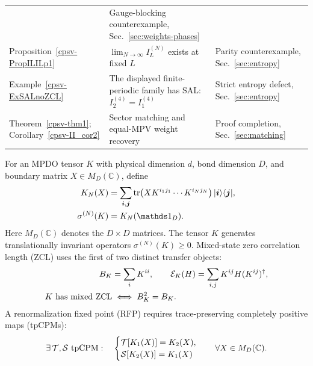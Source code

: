 \documentclass[aps,pra,reprint,nofootinbib,onecolumn]{revtex4-2}
\begin{document}
\begin{table}[t]
\begin{tabular}{@{}p{}p{}p{}@{}}
		                   & \raggedcell Gauge-blocking counterexample, Sec.~\ref{sec:weights-phases}                                                   \\[0.4em]
		\raggedcell Proposition~\ref{cpsv-PropILILp1}
		                   & \raggedcell $\lim_{N\to\infty}I_L^{(N)}$ exists at fixed $L$
		                   & \raggedcell Parity counterexample, Sec.~\ref{sec:entropy}                                                                  \\[0.4em]
		\raggedcell Example~\ref{cpsv-ExSALnoZCL}
		                   & \raggedcell The displayed finite-periodic family has SAL: $I_2^{(4)}=I_1^{(4)}$
		                   & \raggedcell Strict entropy defect, Sec.~\ref{sec:entropy}                                                                  \\[0.4em]
		\raggedcell Theorem~\ref{cpsv-thm1}; Corollary~\ref{cpsv-II_cor2}
		                   & \raggedcell Sector matching and equal-MPV weight recovery
		                   & \raggedcell Proof completion, Sec.~\ref{sec:matching}                                                                      \\
		\bottomrule
	\end{tabular}
\end{table}

For an MPDO tensor $K$ with physical dimension $d$, bond dimension
$D$, and boundary matrix $X\in M_D(\mathbb C)$, define
\begin{align}
	K_N(X)
	                & =\sum_{\boldsymbol i,\boldsymbol j}
	\tr\!\left(XK^{i_1j_1}\cdots K^{i_Nj_N}\right)
	\ket{\boldsymbol i}\bra{\boldsymbol j},
	\label{eq:closure}                                    \\
	\sigma^{(N)}(K) & =K_N(\Id_D).\nonumber
\end{align}
Here $M_D(\mathbb C)$ denotes the $D\times D$ matrices. The tensor
$K$ generates translationally invariant operators $\sigma^{(N)}(K)\geq0$.
Mixed-state zero correlation length (ZCL) uses the first of two distinct
transfer objects:
\begin{align}
	B_K                    & =\sum_iK^{ii},\qquad
	\mathcal{E}_K(H)=\sum_{i,j}K^{ij}H(K^{ij})^\dagger,
	\label{eq:transfer-objects}                   \\
	K\text{ has mixed ZCL} & \iff B_K^2=B_K.
	\label{eq:mixed-zcl-def}
\end{align}
A renormalization fixed point (RFP) requires trace-preserving
completely positive maps (tpCPMs):
\begin{align}
	\exists\,\mathcal{T},\mathcal{S}\text{ tpCPM}:\quad
	\begin{cases}
		\mathcal{T}[K_1(X)]=K_2(X), \\
		\mathcal{S}[K_2(X)]=K_1(X)
	\end{cases}
	\quad\forall X\in M_D(\mathbb C).
	\label{eq:rfp-def}
\end{align}
\end{document}
